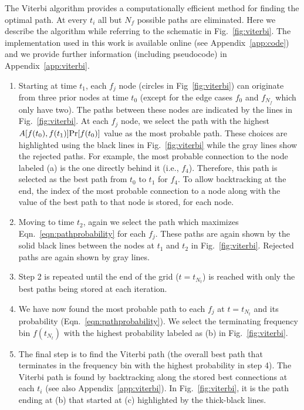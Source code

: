 \documentclass[paper-main.tex]{subfiles}
\begin{document}
The Viterbi algorithm provides a computationally efficient method for finding the optimal path. 
At every $t_i$ all but $N_f$ possible paths are eliminated. 
Here we describe the algorithm while referring to the schematic in Fig.~\ref{fig:viterbi}.  
The implementation used in this work is available online (see Appendix~\ref{app:code}) and we provide further information (including pseudocode) in Appendix~\ref{app:viterbi}.
\begin{enumerate}
\item Starting at time $t_1$, each $f_j$ node (circles in Fig~\ref{fig:viterbi}) can originate from three prior nodes at time $t_0$ (except for the edge cases $f_0$ and $f_{N_f}$ which only have two). 
The paths between these nodes are indicated by the lines in Fig.~\ref{fig:viterbi}. 
At each $f_j$ node, we select the path with the highest $A[f(t_0),f(t_1)] {\rm Pr}[f(t_0)]$ value as the most probable path. 
These choices are highlighted using the black lines in Fig.~\ref{fig:viterbi} while the gray lines show the rejected paths. 
For example, the most probable connection to the node labeled (a) is the one directly behind it (i.e., $f_4$). 
Therefore, this path is selected as the best path from $t_0$ to $t_1$ for $f_4$.
To allow backtracking at the end, the index of the most probable connection to a node along with the value of the best path to that node is stored, for each node.

\item Moving to time $t_2$, again we select the path which maximizes Eqn.~\ref{eqn:pathprobability} for each $f_j$. 
These paths are again shown by the solid black lines between the nodes at $t_1$ and $t_2$ in Fig.~\ref{fig:viterbi}.
Rejected paths are again shown by gray lines. 

\item Step 2 is repeated until the end of the grid ($t=t_{N_t}$) is reached with only the best paths being stored at each iteration. 

\item We have now found the most probable path to each $f_j$ at $t=t_{N_t}$ and its probability (Eqn.~\ref{eqn:pathprobability}). 
We select the terminating frequency bin $f(t_{N_t})$ with the highest probability labeled as (b) in Fig.~\ref{fig:viterbi}.

\item The final step is to find the Viterbi path (the overall best path that terminates in the frequency bin with the highest probability in step 4). 
The Viterbi path is found by backtracking along the stored best connections at each $t_i$ (see also Appendix~\ref{app:viterbi}). 
In Fig.~\ref{fig:viterbi}, it is the path ending at (b) that started at (c) highlighted by the thick-black lines.
\end{enumerate}
\end{document}
